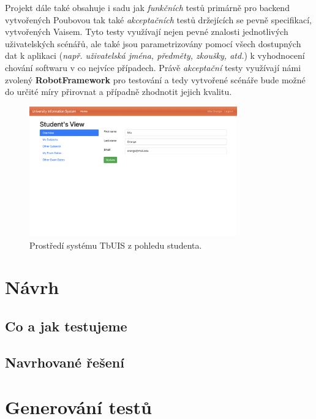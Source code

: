 \documentclass[czech, ma, kiv, he, iso690alph, pdf, viewonly]{fasthesis}
\begin{document}
    Projekt dále také obsahuje i sadu jak \textit{funkčních} testů primárně pro backend vytvořených Poubovou tak také \textit{akceptačních} testů držejících se pevně specifikací, vytvořených Vaisem. \cite{Poubova2019} \cite{Vais2020} Tyto testy využívají nejen pevné znalosti jednotlivých uživatelských scénářů, ale také jsou parametrizovány pomocí všech dostupných dat k aplikaci (\textit{např. uživatelská jména, předměty, zkoušky, atd.}) k vyhodnocení chování softwaru v co nejvíce případech. Právě \textit{akceptační} testy využívají námi zvolený \textbf{RobotFramework} pro testování a tedy vytvořené scénáře bude možné do určité míry přirovnat a případně zhodnotit jejich kvalitu. 

    \begin{figure}
        \includegraphics[width=0.8\textwidth]{pic/tbuis.png}
        \centering
        \caption{Prostředí systému TbUIS z pohledu studenta.}
        \label{fig:tbuis}
    \end{figure}

\chapter{Návrh}

        \section{Co a jak testujeme}

        \section{Navrhované řešení}


\chapter{Generování testů}
\end{document}
